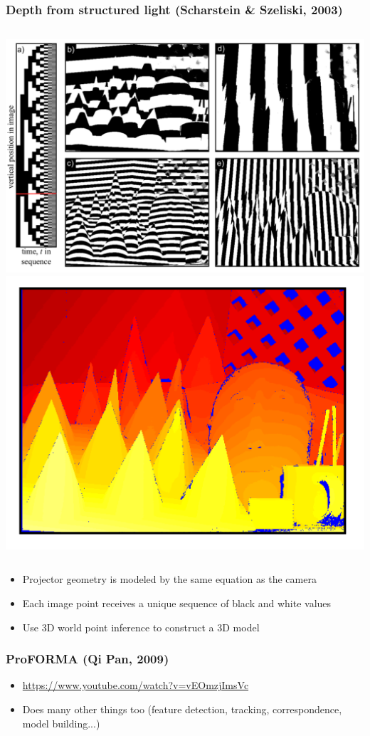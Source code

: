 \documentclass{beamer}
\begin{document}
\begin{frame}
  \frametitle{Depth from structured light (Scharstein \& Szeliski, 2003)}
  \begin{columns}[c]
  \includegraphics[width=1.0\textwidth]{fig/structured.png}
  \includegraphics[width=1.0\textwidth]{fig/structured2.png}
  \end{columns}
\begin{itemize}[<+->]
  \item Projector geometry is modeled by the same equation as the camera
  \item Each image point receives a unique sequence of black and white values
  \item Use 3D world point inference to construct a 3D model
\end{itemize}

\end{frame}

\begin{frame}
  \frametitle{ProFORMA (Qi Pan, 2009)}
  \begin{itemize}
    \item \url{https://www.youtube.com/watch?v=vEOmzjImsVc}
    \item Does many other things too (feature detection, tracking,
      correspondence, model building...)
  \end{itemize}
\end{frame}
\end{document}
